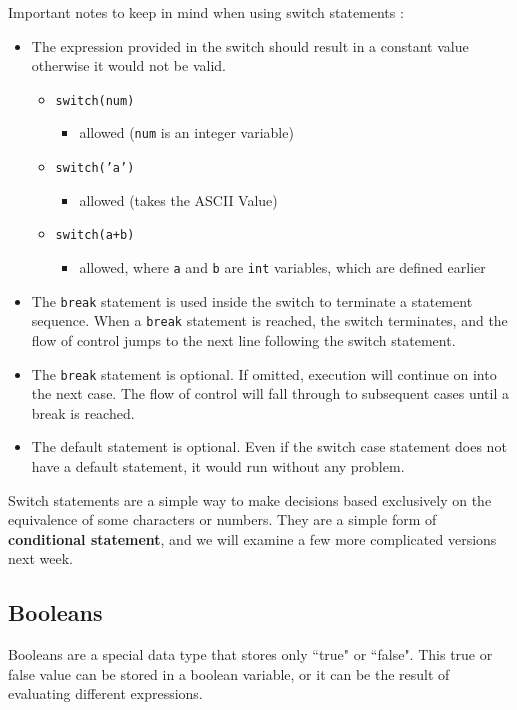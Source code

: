 Important notes to keep in mind when using switch statements :

\begin{itemize}
    \item The expression provided in the switch should result in a constant value otherwise it would not be valid.
    \begin{itemize}
        \item \texttt{switch(num)}
        \begin{itemize}
            \item allowed (\texttt{num} is an integer variable)
        \end{itemize}
        \item \texttt{switch('a')}
        \begin{itemize}
            \item allowed (takes the ASCII Value)
        \end{itemize}
        \item \texttt{switch(a+b)}
        \begin{itemize}
            \item allowed, where \texttt{a} and \texttt{b} are \texttt{int} variables, which are defined earlier
        \end{itemize}
    \end{itemize}
    \item The \texttt{break} statement is used inside the switch to terminate a statement sequence. When a \texttt{break} statement is reached, the switch terminates, and the flow of control jumps to the next line following the switch statement.
    \item The \texttt{break} statement is optional. If omitted, execution will continue on into the next case. The flow of control will fall through to subsequent cases until a break is reached.
    \item The default statement is optional. Even if the switch case statement does not have a default statement, it would run without any problem.
\end{itemize}

Switch statements are a simple way to make decisions based exclusively on the equivalence of some characters or numbers. They are a simple form of \textbf{conditional statement}, and we will examine a few more complicated versions next week. 

\subsection{Booleans}
Booleans are a special data type that stores only ``true" or ``false". This true or false value can be stored in a boolean variable, or it can be the result of evaluating different expressions.

